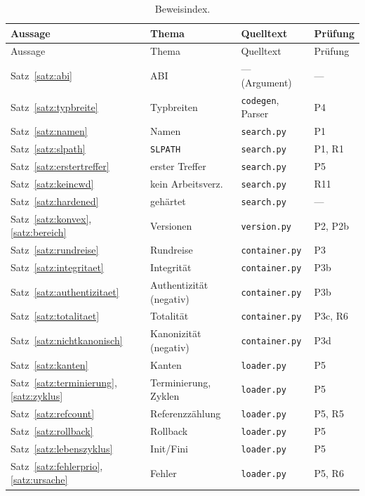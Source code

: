 \documentclass[a4paper,12pt,twoside]{report}
\DeclareRobustCommand{\_}{\ifmmode\mbox{\textunderscore}\else\textunderscore\allowbreak{}\fi}
\theoremstyle{definition}
\begin{document}
\begin{longtable}{@{}L{4.6cm}L{3.0cm}L{4.0cm}L{2.8cm}@{}}
	\caption{Beweisindex.}\label{tab:index}\\
	\toprule Aussage & Thema & Quelltext & Prüfung \\ \midrule
	\endfirsthead
	\toprule Aussage & Thema & Quelltext & Prüfung \\ \midrule
	\endhead
	Satz~\ref{satz:abi} & ABI & --- (Argument) & --- \\
	Satz~\ref{satz:typbreite} & Typbreiten & \texttt{codegen}, Parser & P4 \\
	Satz~\ref{satz:namen} & Namen & \texttt{search.py} & P1 \\
	Satz~\ref{satz:slpath} & \texttt{SL\_PATH} & \texttt{search.py} & P1, R1 \\
	Satz~\ref{satz:erstertreffer} & erster Treffer & \texttt{search.py} & P5 \\
	Satz~\ref{satz:keincwd} & kein Arbeitsverz. & \texttt{search.py} & R11 \\
	Satz~\ref{satz:hardened} & gehärtet & \texttt{search.py} & --- \\
	Satz~\ref{satz:konvex}, \ref{satz:bereich} & Versionen & \texttt{version.py} & P2, P2b \\
	Satz~\ref{satz:rundreise} & Rundreise & \texttt{container.py} & P3 \\
	Satz~\ref{satz:integritaet} & Integrität & \texttt{container.py} & P3b \\
	Satz~\ref{satz:authentizitaet} & Authentizität (negativ) & \texttt{container.py} & P3b \\
	Satz~\ref{satz:totalitaet} & Totalität & \texttt{container.py} & P3c, R6 \\
	Satz~\ref{satz:nichtkanonisch} & Kanonizität (negativ) & \texttt{container.py} & P3d \\
	Satz~\ref{satz:kanten} & Kanten & \texttt{loader.py} & P5 \\
	Satz~\ref{satz:terminierung}, \ref{satz:zyklus} & Terminierung, Zyklen & \texttt{loader.py} & P5 \\
	Satz~\ref{satz:refcount} & Referenzzählung & \texttt{loader.py} & P5, R5 \\
	Satz~\ref{satz:rollback} & Rollback & \texttt{loader.py} & P5 \\
	Satz~\ref{satz:lebenszyklus} & Init/Fini & \texttt{loader.py} & P5 \\
	Satz~\ref{satz:fehlerprio}, \ref{satz:ursache} & Fehler & \texttt{loader.py} & P5, R6 \\

\end{longtable}
\end{document}
